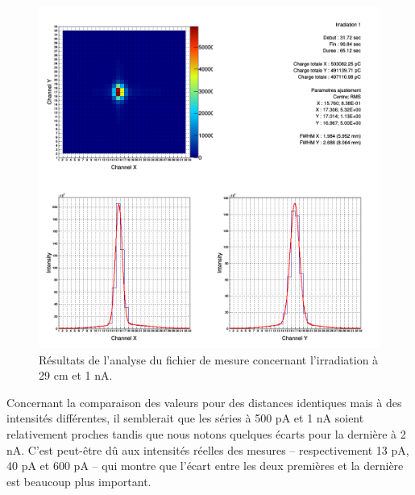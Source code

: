 \documentclass[a4paper,11pt]{article}
\begin{document}
\begin{figure}[h]
\begin{center}
\includegraphics[width=1.\linewidth]{Area_1.png} 
\caption{\label{fig:analyse}\footnotesize{Résultats de l'analyse du fichier de mesure concernant l'irradiation à 29 cm et 1 nA.}}
\end{center}
\end{figure}

Concernant la comparaison des valeurs pour des distances identiques mais à des intensités différentes, il semblerait que les séries à 500 pA et 1 nA soient relativement proches tandis que nous notons quelques écarts pour la dernière à 2 nA.
C'est peut-être dû aux intensités réelles des mesures -- respectivement 13 pA, 40 pA et 600 pA -- qui montre que l'écart entre les deux premières et la dernière est beaucoup plus important.
 
\end{document}
